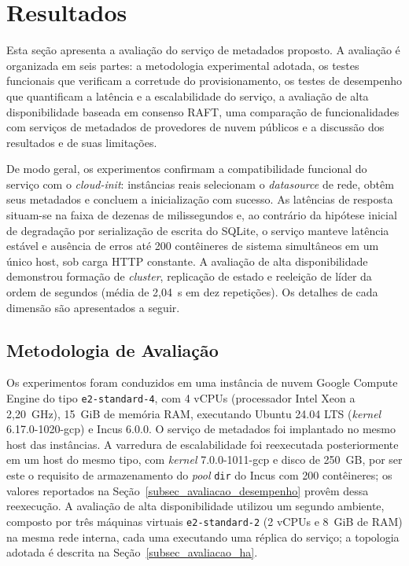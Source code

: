 \section{Resultados}
\label{sec_resultados}

Esta seção apresenta a avaliação do serviço de metadados proposto. A avaliação é organizada em seis partes: a metodologia experimental adotada, os testes funcionais que verificam a corretude do provisionamento, os testes de desempenho que quantificam a latência e a escalabilidade do serviço, a avaliação de alta disponibilidade baseada em consenso RAFT, uma comparação de funcionalidades com serviços de metadados de provedores de nuvem públicos e a discussão dos resultados e de suas limitações.

De modo geral, os experimentos confirmam a compatibilidade funcional do serviço com o \textit{cloud-init}: instâncias reais selecionam o \textit{datasource} de rede, obtêm seus metadados e concluem a inicialização com sucesso. As latências de resposta situam-se na faixa de dezenas de milissegundos e, ao contrário da hipótese inicial de degradação por serialização de escrita do SQLite, o serviço manteve latência estável e ausência de erros até 200 contêineres de sistema simultâneos em um único host, sob carga HTTP constante. A avaliação de alta disponibilidade demonstrou formação de \textit{cluster}, replicação de estado e reeleição de líder da ordem de segundos (média de 2{,}04~s em dez repetições). Os detalhes de cada dimensão são apresentados a seguir.

\subsection{Metodologia de Avaliação}
\label{subsec_metodologia}

Os experimentos foram conduzidos em uma instância de nuvem Google Compute Engine do tipo \texttt{e2-standard-4}, com 4 vCPUs (processador Intel Xeon a 2{,}20~GHz), 15~GiB de memória RAM, executando Ubuntu 24.04 LTS (\textit{kernel} 6.17.0-1020-gcp) e Incus 6.0.0. O serviço de metadados foi implantado no mesmo host das instâncias. A varredura de escalabilidade foi reexecutada posteriormente em um host do mesmo tipo, com \textit{kernel} 7.0.0-1011-gcp e disco de 250~GB, por ser este o requisito de armazenamento do \textit{pool} \texttt{dir} do Incus com 200 contêineres; os valores reportados na Seção~\ref{subsec_avaliacao_desempenho} provêm dessa reexecução. A avaliação de alta disponibilidade utilizou um segundo ambiente, composto por três máquinas virtuais \texttt{e2-standard-2} (2 vCPUs e 8~GiB de RAM) na mesma rede interna, cada uma executando uma réplica do serviço; a topologia adotada é descrita na Seção~\ref{subsec_avaliacao_ha}.

